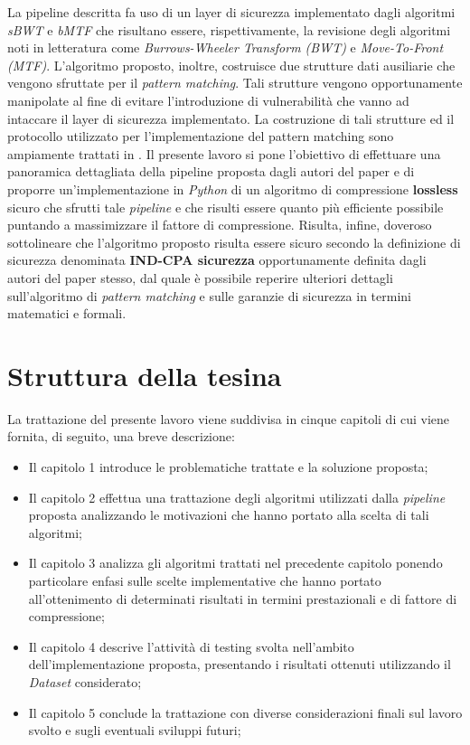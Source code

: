 La pipeline descritta fa uso di un layer di sicurezza implementato dagli algoritmi \emph{sBWT} e \emph{bMTF} che risultano essere, rispettivamente, la revisione degli algoritmi noti in letteratura come \emph{Burrows-Wheeler Transform (BWT)} e \emph{Move-To-Front (MTF)}. L'algoritmo proposto, inoltre, costruisce due strutture dati ausiliarie che vengono sfruttate per il \emph{pattern matching}. Tali strutture vengono opportunamente manipolate al fine di evitare l'introduzione di vulnerabilità che vanno ad intaccare il layer di sicurezza implementato. La costruzione di tali strutture ed il protocollo utilizzato per l'implementazione del pattern matching sono ampiamente trattati in \cite{zeng2018secure}. Il presente lavoro si pone l'obiettivo di effettuare una panoramica dettagliata della pipeline proposta dagli autori del paper \cite{zeng2018secure} e di proporre un'implementazione in \emph{Python} di un algoritmo di compressione \textbf{lossless} sicuro che sfrutti tale \emph{pipeline} e che risulti essere quanto più efficiente possibile puntando a massimizzare il fattore di compressione. Risulta, infine, doveroso sottolineare che l'algoritmo proposto risulta essere sicuro secondo la definizione di sicurezza denominata \textbf{IND-CPA sicurezza} opportunamente definita dagli autori del paper \cite{zeng2018secure} stesso, dal quale è possibile reperire ulteriori dettagli sull'algoritmo di \emph{pattern matching} e sulle garanzie di sicurezza in termini matematici e formali.
\section{Struttura della tesina} 
La trattazione del presente lavoro viene suddivisa in cinque capitoli di cui viene fornita, di seguito, una breve descrizione:
\begin{itemize}
    \item Il capitolo 1 introduce le problematiche trattate e la soluzione proposta;
    \item Il capitolo 2 effettua una trattazione degli algoritmi utilizzati dalla \emph{pipeline} proposta analizzando le motivazioni che hanno portato alla scelta di tali algoritmi;
    \item Il capitolo 3 analizza gli algoritmi trattati nel precedente capitolo ponendo particolare enfasi sulle scelte implementative che hanno portato all'ottenimento di determinati risultati in termini prestazionali e di fattore di compressione;
    \item Il capitolo 4 descrive l'attività di testing svolta nell'ambito dell'implementazione proposta, presentando i risultati ottenuti utilizzando il \emph{Dataset} considerato;
    \item Il capitolo 5 conclude la trattazione con diverse considerazioni finali sul lavoro svolto e sugli eventuali sviluppi futuri;
\end{itemize}